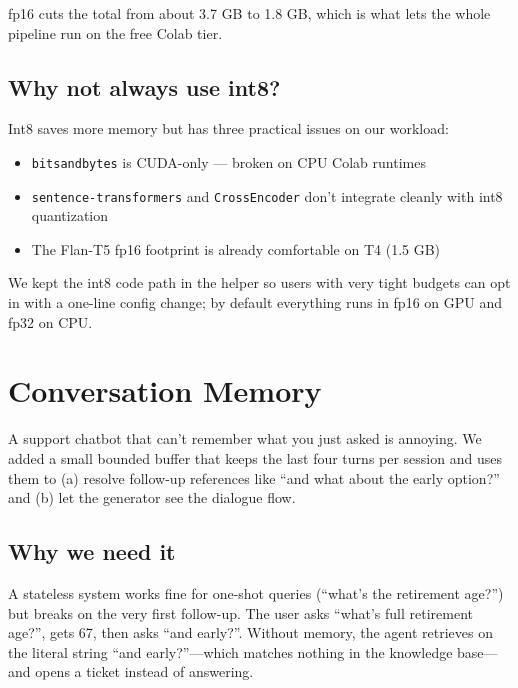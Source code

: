 \documentclass[11pt,a4paper]{article}
\begin{document}
fp16 cuts the total from about 3.7 GB to 1.8 GB, which is what lets the whole pipeline run on the free Colab tier.

\subsection{Why not always use int8?}

Int8 saves more memory but has three practical issues on our workload:
\begin{itemize}[leftmargin=*, itemsep=1pt]
\item \texttt{bitsandbytes} is CUDA-only --- broken on CPU Colab runtimes
\item \texttt{sentence-transformers} and \texttt{CrossEncoder} don't integrate cleanly with int8 quantization
\item The Flan-T5 fp16 footprint is already comfortable on T4 (1.5 GB)
\end{itemize}

We kept the int8 code path in the helper so users with very tight budgets can opt in with a one-line config change; by default everything runs in fp16 on GPU and fp32 on CPU.

\clearpage
\section{Conversation Memory}

\begin{keyidea}
A support chatbot that can't remember what you just asked is annoying. We added a small bounded buffer that keeps the last four turns per session and uses them to (a) resolve follow-up references like ``and what about the early option?'' and (b) let the generator see the dialogue flow.
\end{keyidea}

\subsection{Why we need it}

A stateless system works fine for one-shot queries (``what's the retirement age?'') but breaks on the very first follow-up. The user asks ``what's full retirement age?'', gets 67, then asks ``and early?''. Without memory, the agent retrieves on the literal string ``and early?''---which matches nothing in the knowledge base---and opens a ticket instead of answering.
\end{document}
